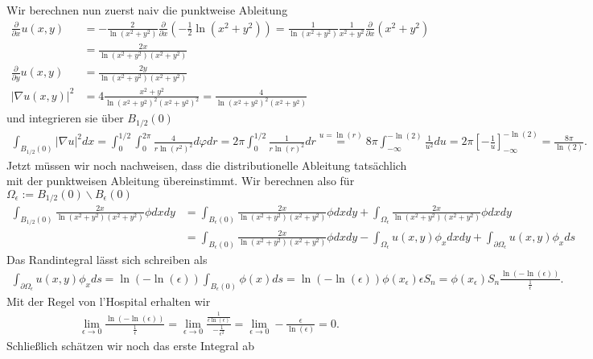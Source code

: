 \begin{solution}
Wir berechnen nun zuerst naiv die punktweise Ableitung
\begin{align*}
  \frac{\partial}{\partial x} u(x,y) &= -\frac{2}{\ln(x^2+y^2)}
  \frac{\partial}{\partial x}(-\frac{1}{2}\ln(x^2+y^2)) =
  \frac{1}{\ln(x^2+y^2)}\frac{1}{x^2+y^2}\frac{\partial}{\partial x}(x^2+y^2) \\
  &= \frac{2x}{\ln(x^2+y^2)(x^2+y^2)} \\
  \frac{\partial}{\partial y} u(x,y) &= \frac{2y}{\ln(x^2+y^2)(x^2+y^2)} \\
  |\nabla u(x,y)|^2 &= 4\frac{x^2+y^2}{\ln(x^2+y^2)^2(x^2+y^2)^2} = \frac{4}{\ln(x^2+y^2)^2(x^2+y^2)}
\end{align*}
und integrieren sie über $B_{1/2}(0)$
\begin{align*}
  \int_{B_{1/2}(0)}|\nabla u|^2 dx = \int_0^{1/2}\int_0^{2\pi}\frac{4}{r\ln(r^2)^2} d\varphi dr
= 2\pi\int_0^{1/2}\frac{1}{r\ln(r)^2} dr
\stackrel{u = \ln(r)}{=} 8\pi \int_{-\infty}^{-\ln(2)} \frac{1}{u^2} du
  = 2\pi[-\frac{1}{u}]_{-\infty}^{-\ln(2)} = \frac{8\pi}{\ln(2)}.
\end{align*}
Jetzt müssen wir noch nachweisen, dass die distributionelle Ableitung
tatsächlich mit der punktweisen Ableitung übereinstimmt.
Wir berechnen also für $\Omega_\epsilon := B_{1/2}(0)\backslash B_\epsilon(0)$
\begin{align*}
  \int_{B_{1/2}(0)}\frac{2x}{\ln(x^2+y^2)(x^2+y^2)}\phi dxdy &=
  \int_{B_\epsilon(0)}\frac{2x}{\ln(x^2+y^2)(x^2+y^2)}\phi dxdy
  + \int_{\Omega_\epsilon}\frac{2x}{\ln(x^2+y^2)(x^2+y^2)}\phi dxdy \\
  &= \int_{B_\epsilon(0)}\frac{2x}{\ln(x^2+y^2)(x^2+y^2)}\phi dxdy
  - \int_{\Omega_\epsilon}u(x,y)\phi_x dxdy +
  \int_{\partial \Omega_\epsilon}u(x,y)\phi_x ds
\end{align*}
Das Randintegral lässt sich schreiben  als
\begin{align*}
  \int_{\partial \Omega_\epsilon}u(x,y)\phi_x ds
  = \ln(-\ln(\epsilon))\int_{B_\epsilon(0)}\phi(x) ds = \ln(-\ln(\epsilon))\phi(x_\epsilon)\epsilon S_n
  = \phi(x_\epsilon)S_n\frac{\ln(-\ln(\epsilon))}{\frac{1}{\epsilon}}.
\end{align*}
Mit der Regel von l'Hospital erhalten wir
\begin{align*}
  \lim_{\epsilon \to 0}\frac{\ln(-\ln(\epsilon))}{\frac{1}{\epsilon}}
  = \lim_{\epsilon \to 0}\frac{\frac{1}{\epsilon\ln(\epsilon)}}{-\frac{1}{\epsilon^2}}
  = \lim_{\epsilon \to 0}-\frac{\epsilon}{\ln(\epsilon)} = 0.
\end{align*}
Schließlich schätzen wir noch das erste Integral ab

\end{solution}
